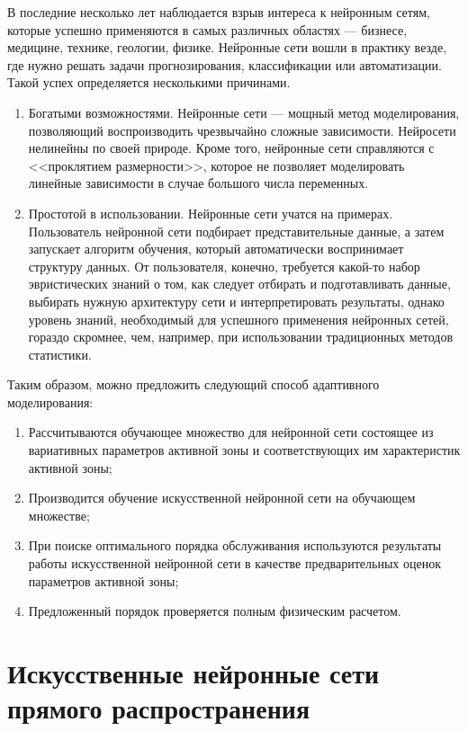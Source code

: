 В последние несколько лет наблюдается взрыв интереса к нейронным сетям, которые успешно применяются в самых различных областях --- бизнесе, медицине, технике, геологии, физике. 
Нейронные сети вошли в практику везде, где нужно решать задачи прогнозирования, классификации или автоматизации. 
Такой успех определяется несколькими причинами.
\begin{enumerate}
 \item Богатыми возможностями. 
 Нейронные сети --- мощный метод моделирования, позволяющий воспроизводить чрезвычайно сложные зависимости.
 Нейросети нелинейны по своей природе. 
 Кроме того, нейронные сети справляются с <<проклятием размерности>>, которое не позволяет моделировать линейные зависимости в случае большого числа переменных.
 \item Простотой в использовании. 
 Нейронные сети учатся на примерах. 
 Пользователь нейронной сети подбирает представительные данные, а затем запускает алгоритм обучения, который автоматически воспринимает структуру данных. 
 От пользователя, конечно, требуется какой-то набор эвристических знаний о том, как следует отбирать и подготавливать данные, выбирать нужную архитектуру сети и интерпретировать результаты, однако уровень знаний, необходимый для успешного применения нейронных сетей, гораздо скромнее, чем, например, при использовании традиционных методов статистики.\cite{neuron-filatova}
\end{enumerate}

Таким образом, можно предложить следующий способ адаптивного моделирования:
\begin{enumerate}
 \item Рассчитываются обучающее множество для нейронной сети состоящее из вариативных параметров активной зоны и соответствующих им характеристик активной зоны;
 \item Производится обучение искусственной нейронной сети на обучающем множестве;
 \item При поиске оптимального порядка обслуживания используются результаты работы искусственной нейронной сети в качестве предварительных оценок параметров активной зоны;
 \item Предложенный порядок проверяется полным физическим расчетом.
\end{enumerate}

\section{Искусственные нейронные сети прямого распространения}

